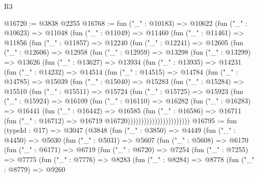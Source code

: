 \begin{lexlean}{R3}
\begin{coremodule}
@16720 := @3838 @2255
@16768 := fun ("_" : @10183) =>
  @10622
    (fun ("_" : @10623) =>
    @11048
      (fun ("_" : @11049) =>
      @11460
        (fun ("_" : @11461) =>
        @11856
          (fun ("_" : @11857) =>
          @12240
            (fun ("_" : @12241) =>
            @12605
              (fun ("_" : @12606) =>
              @12958
                (fun ("_" : @12959) =>
                @13298
                  (fun ("_" : @13299) =>
                  @13626
                    (fun ("_" : @13627) =>
                    @13934
                      (fun ("_" : @13935) =>
                      @14231
                        (fun ("_" : @14232) =>
                        @14514
                          (fun ("_" : @14515) =>
                          @14784
                            (fun ("_" : @14785) =>
                            @15039
                              (fun ("_" : @15040) =>
                              @15283
                                (fun ("_" : @15284) =>
                                @15510
                                  (fun ("_" : @15511) =>
                                  @15724
                                    (fun ("_" : @15725) =>
                                    @15923
                                      (fun ("_" : @15924) =>
                                      @16109
                                        (fun ("_" : @16110) =>
                                        @16282
                                          (fun ("_" : @16283) =>
                                          @16441
                                            (fun ("_" : @16442) =>
                                            @16585
                                              (fun ("_" : @16586) =>
                                              @16711
                                                (fun ("_" : @16712) =>
                                                @16719 @16720)))))))))))))))))))))))
@16795 := fun (typeId : @17) =>
  @3047
    (@3848
      (fun ("_" : @3850) =>
      @4449
        (fun ("_" : @4450) =>
        @5030
          (fun ("_" : @5031) =>
          @5607
            (fun ("_" : @5608) =>
            @6170
              (fun ("_" : @6171) =>
              @6719
                (fun ("_" : @6720) =>
                @7254
                  (fun ("_" : @7255) =>
                  @7775
                    (fun ("_" : @7776) =>
                    @8283
                      (fun ("_" : @8284) =>
                      @8778
                        (fun ("_" : @8779) =>
                        @9260

\end{coremodule}
\end{lexlean}
